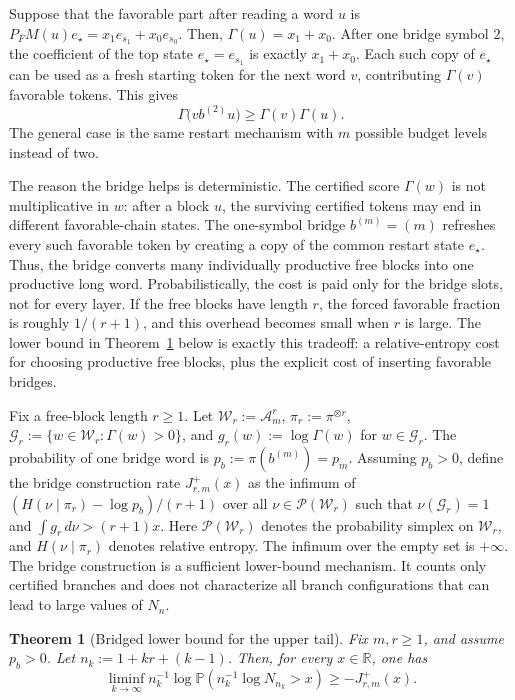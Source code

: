 \documentclass[11pt]{amsart}
\numberwithin{equation}{section}
\theoremstyle{plain}
\newtheorem{theorem}{Theorem}[section]
\theoremstyle{definition}
\theoremstyle{remark}
\begin{document}
Suppose that the favorable part after reading a word \(u\) is
\(
P_FM(u)e_\star=x_1e_{s_1}+x_0e_{s_0}.
\)
Then, \(\Gamma(u)=x_1+x_0\). After one bridge symbol \(2\), the coefficient of the top state \(e_\star=e_{s_1}\) is exactly \(x_1+x_0\). Each such copy of \(e_\star\) can be used as a fresh starting token for the next word \(v\), contributing \(\Gamma(v)\) favorable tokens. This gives
\[
\Gamma\big(vb^{(2)}u\big)\ge \Gamma(v)\Gamma(u).
\]
The general case is the same restart mechanism with \(m\) possible budget levels instead of two.

The reason the bridge helps is deterministic. The certified score \(\Gamma(w)\) is not multiplicative in \(w\): after a block \(u\), the surviving certified tokens may end in different favorable-chain states. The one-symbol bridge \(b^{(m)}=(m)\) refreshes every such favorable token by creating a copy of the common restart state \(e_\star\). Thus, the bridge converts many individually productive free blocks into one productive long word. Probabilistically, the cost is paid only for the bridge slots, not for every layer. If the free blocks have length \(r\), the forced favorable fraction is roughly \(1/(r+1)\), and this overhead becomes small when \(r\) is large. The lower bound in Theorem~\ref{thm:main-bridge-lower} below is exactly this tradeoff: a relative-entropy cost for choosing productive free blocks, plus the explicit cost of inserting favorable bridges.

Fix a free-block length \(r\ge1\). Let \(\mathcal W_r:=\mathcal A_m^r\), \(\pi_r:=\pi^{\otimes r}\), \(\mathcal G_r:=\{w\in\mathcal W_r:\Gamma(w)>0\}\), and \(g_r(w):=\log\Gamma(w)\) for \(w\in\mathcal G_r\). The probability of one bridge word is \(p_b:=\pi(b^{(m)})=p_m\). Assuming \(p_b>0\), define the bridge construction rate \(J_{r,m}^{+}(x)\) as the infimum of \((H(\nu\mid\pi_r)-\log p_b)/(r+1)\) over all \(\nu\in\mathcal P(\mathcal W_r)\) such that \(\nu(\mathcal G_r)=1\) and \(\int g_r\,d\nu>(r+1)x\). Here \(\mathcal P(\mathcal W_r)\) denotes the probability simplex on \(\mathcal W_r\), and \(H(\nu\mid\pi_r)\) denotes relative entropy. The infimum over the empty set is \(+\infty\).
The bridge construction is a sufficient lower-bound mechanism. It counts only certified branches and does not characterize all branch configurations that can lead to large values of \(N_n\).

\begin{theorem}[Bridged lower bound for the upper tail]\label{thm:main-bridge-lower}
Fix \(m,r\ge1\), and assume \(p_b>0\). Let \(n_k:=1+kr+(k-1)\). Then, for every \(x\in\mathbb R\), one has 
\[\liminf_{k\to\infty} n_k^{-1}\log\mathbb P(n_k^{-1}\log N_{n_k}>x)\ge -J_{r,m}^{+}(x).\]
\end{theorem}
\end{document}

